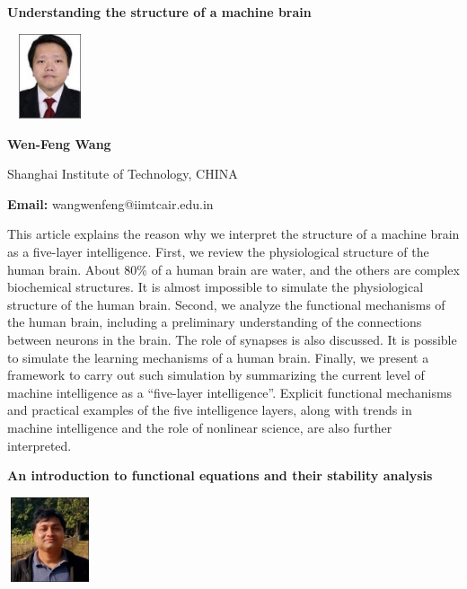 \documentclass[twoside,11pt]{amsart}
\begin{document}
\vskip 10mm
\begin{center}\bf\LARGE
Understanding the structure of a machine brain
\end{center}
\vskip 5mm
\begin{center}
\includegraphics[width=2.5cm, height=2.5cm, keepaspectratio=false]{Wang2.jpg}
\end{center}
\vskip 2mm

\centerline{\textbf{ Wen-Feng Wang }}
\vskip 2mm
\begin{flushleft}
Shanghai Institute of Technology, CHINA
\end{flushleft}
\vskip 2mm
\begin{flushleft}
{\bf Email:} wangwenfeng@iimtcair.edu.in
\end{flushleft}
\vskip 10mm
This article explains the reason why we interpret the structure of a machine brain as a five-layer intelligence. First, we review the physiological structure of the human brain. About 80\% of a human brain are water, and the others are complex biochemical structures. It is almost impossible to simulate the physiological structure of the human brain. Second, we analyze the functional mechanisms of the human brain, including a preliminary understanding of the connections between neurons in the brain. The role of synapses is also discussed. It is possible to simulate the learning mechanisms of a human brain. Finally, we present a framework to carry out such simulation by summarizing the current level of machine intelligence as a “five-layer intelligence”. Explicit functional mechanisms and practical examples of the five intelligence layers, along with trends in machine intelligence and the role of nonlinear science, are also further interpreted.
\vskip 5mm
\newpage
\vskip 10mm

\begin{center}\bf\LARGE
An introduction to functional equations and their stability analysis
\end{center}
\vskip 5mm
\begin{center}
\includegraphics[width=2.5cm, height=2.5cm, keepaspectratio=false]{HD2.jpg}
\end{center}
\vskip 2mm
\end{document}

